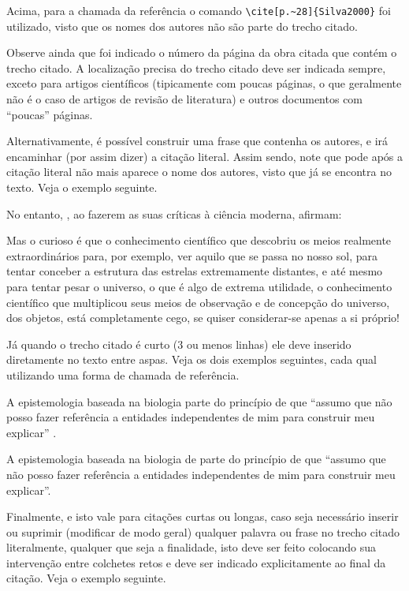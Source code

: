 \begin{apendicesenv}
    Acima, para a chamada da referência o comando \verb|\cite[p.~28]{Silva2000}| foi utilizado, visto que os nomes dos autores não são parte do trecho citado.

    Observe ainda que foi indicado o número da página da obra citada que contém o trecho citado.
    A localização precisa do trecho citado deve ser indicada sempre, exceto para artigos científicos (tipicamente com poucas páginas, o que geralmente não é o caso de artigos de revisão de literatura) e outros documentos com ``poucas'' páginas.

    Alternativamente, é possível construir uma frase que contenha os autores, e irá encaminhar (por assim dizer) a citação literal.
    Assim sendo, note que pode após a citação literal não mais aparece o nome dos autores, visto que já se encontra no texto.
    Veja o exemplo seguinte.

    No entanto, , ao fazerem as suas críticas à ciência moderna, afirmam:

    \begin{citacao}
        Mas o curioso é que o conhecimento científico que descobriu os meios realmente extraordinários para, por exemplo, ver aquilo que se passa no nosso sol, para tentar conceber a estrutura das estrelas extremamente distantes, e até mesmo para tentar pesar o universo, o que é algo de extrema utilidade, o conhecimento científico que multiplicou seus meios de observação e de concepção do universo, dos objetos, está completamente cego, se quiser considerar-se apenas a si próprio!
    \end{citacao}

    Já quando o trecho citado é curto (3 ou menos linhas) ele deve inserido diretamente no texto entre aspas.
    Veja os dois exemplos seguintes, cada qual utilizando uma forma de chamada de referência.

    A epistemologia baseada na biologia parte do princípio de que ``assumo que não posso fazer referência a entidades independentes de mim para construir meu explicar'' \cite[p.~35]{Maturana2003}.

    A epistemologia baseada na biologia de  parte do princípio de que ``assumo que não posso fazer referência a entidades independentes de mim para construir meu explicar''.

    Finalmente, e isto vale para citações curtas ou longas, caso seja necessário inserir ou suprimir (modificar de modo geral) qualquer palavra ou frase no trecho citado literalmente, qualquer que seja a finalidade, isto deve ser feito colocando sua intervenção entre colchetes retos e deve ser indicado explicitamente ao final da citação.
    Veja o exemplo seguinte.


\end{apendicesenv}
